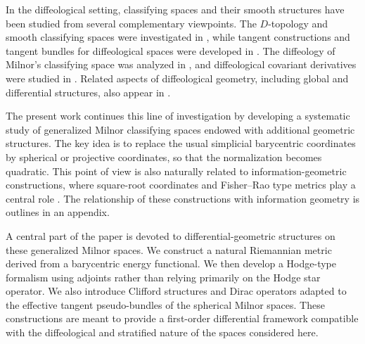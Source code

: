 \documentclass[11pt]{amsart}
\begin{document}
In the diffeological setting, classifying spaces and their smooth structures have been studied from several complementary viewpoints. The \(D\)-topology and smooth classifying spaces were investigated in \cite{ChristensenSinnamonWu2014,ChristensenWuSmooth}, while tangent constructions and tangent bundles for diffeological spaces were developed in \cite{ChristensenWu2016}. The diffeology of Milnor's classifying space was analyzed in \cite{MagnotWatts2017}, and diffeological covariant derivatives were studied in \cite{MagnotConnections}. Related aspects of diffeological geometry, including global and differential structures, also appear in \cite{GMW2023,Magnotloops2019,Savelyev2026,Scalbi2024,Watts2012Thesis}.

The present work continues this line of investigation by developing a systematic study of generalized Milnor classifying spaces endowed with additional geometric structures. The key idea is to replace the usual simplicial barycentric coordinates by spherical or projective coordinates, so that the normalization becomes quadratic. This point of view is also naturally related to information-geometric constructions, where square-root coordinates and Fisher--Rao type metrics play a central role \cite{AmariNagaoka2000,AyJostLeSchwachhofer2017,Rao1945}. The relationship of these constructions with information geometry is outlines in an appendix.

A central part of the paper is devoted to differential-geometric structures on these generalized Milnor spaces. We construct a natural Riemannian metric derived from a barycentric energy functional. We then develop a Hodge-type formalism using adjoints rather than relying primarily on the Hodge star operator.
We also introduce Clifford structures and Dirac operators adapted to the effective tangent pseudo-bundles of the spherical Milnor spaces. These constructions are meant to provide a first-order differential framework compatible with the diffeological and stratified nature of the spaces considered here. 
\end{document}
